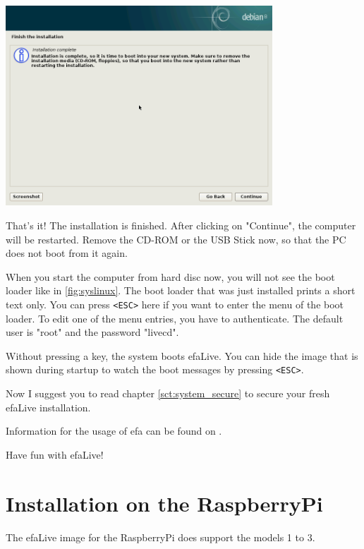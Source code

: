 \documentclass[a4paper,12pt,twoside]{article}
\begin{document}
\bigskip
\begin{minipage}{\linewidth}
    \centering
    \captionsetup{type=figure}
    \includegraphics[width=10cm]{screenshots/finish_installation.png}
    \label{fig:finish}
\end{minipage}
\bigskip

That's it! The installation is finished. After clicking
on "Continue", the computer will be
restarted. Remove the CD-ROM or the USB Stick now, so that the PC does
not boot from it again.

When you start the computer from hard disc now, you will not see the
boot loader like in \ref{fig:syslinux}. The boot loader that was just
installed prints a short text only. You can press
\texttt{{\textless}ESC{\textgreater}} here if you want to enter the menu of the
boot loader. To edit one of the menu entries, you have to authenticate.
The default user is "root" and the password "livecd".

Without pressing a key, the system boots efaLive. You can hide the image
that is shown during startup to watch the boot messages by pressing
\texttt{{\textless}ESC{\textgreater}}.

Now I suggest you to read chapter \ref{sct:system_secure} to
secure your fresh efaLive installation.

\bigskip
Information for the usage of efa can be found on \cite{EFA2}.

\bigskip
Have fun with efaLive!


\section{Installation on the RaspberryPi}
\label{sct:instalation_raspberry}
The efaLive image for the RaspberryPi does support the models 1 to 3.
\end{document}
